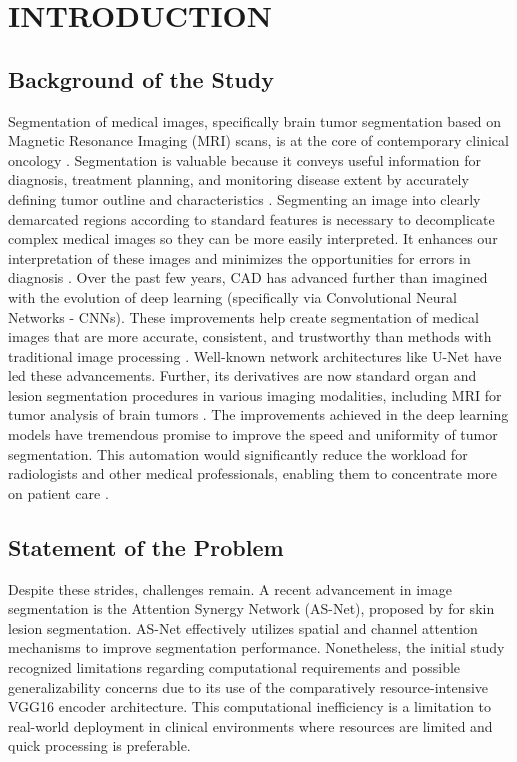 \chapter{INTRODUCTION}

\section{Background of the Study}

Segmentation of medical images, specifically brain tumor segmentation based on Magnetic Resonance Imaging (MRI) scans, is at the core of contemporary clinical oncology \parencite{cai2022novel, liu2021review}. Segmentation is valuable because it conveys useful information for diagnosis, treatment planning, and monitoring disease extent by accurately defining tumor outline and characteristics \parencite{liu2021review, tang2019role}. Segmenting an image into clearly demarcated regions according to standard features is necessary to decomplicate complex medical images so they can be more easily interpreted. It enhances our interpretation of these images and minimizes the opportunities for errors in diagnosis \parencite{liu2021review, handels2013viewpoints}.
Over the past few years, CAD has advanced further than imagined with the evolution of deep learning (specifically via Convolutional Neural Networks - CNNs). These improvements help create segmentation of medical images that are more accurate, consistent, and trustworthy than methods with traditional image processing \parencite{litjens2017survey}. Well-known network architectures like U-Net \parencite{ronneberger2015u} have led these advancements. Further, its derivatives are now standard organ and lesion segmentation procedures in various imaging modalities, including MRI for tumor analysis of brain tumors \parencite{cai2022novel, moorthy2022survey, tang2019role}. The improvements achieved in the deep learning models have tremendous promise to improve the speed and uniformity of tumor segmentation. This automation would significantly reduce the workload for radiologists and other medical professionals, enabling them to concentrate more on patient care \parencite{moorthy2022survey, tang2019role}.

\section{Statement of the Problem}

Despite these strides, challenges remain. A recent advancement in image segmentation is the Attention Synergy Network (AS-Net), proposed by \textcite{hu2022asnet} for skin lesion segmentation. AS-Net effectively utilizes spatial and channel attention mechanisms to improve segmentation performance. Nonetheless, the initial study recognized limitations regarding computational requirements and possible generalizability concerns due to its use of the comparatively resource-intensive VGG16 encoder architecture. This computational inefficiency is a limitation to real-world deployment in clinical environments where resources are limited and quick processing is preferable.

